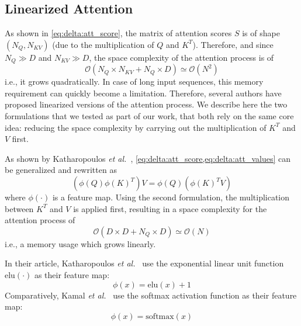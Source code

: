 \subsection{Linearized Attention}\label{sec:delta:intro_transf_att:lin_att}
As shown in \cref{eq:delta:att_score}, the matrix of attention scores \(S\) is of shape \((N_Q, N_{KV})\) (due to the multiplication of \(Q\) and \(K^T\)). Therefore, and since \(N_Q \gg D\) and \(N_{KV} \gg D\), the space complexity of the attention process is of
\begin{equation}
  \mathcal{O}(N_Q\times{}N_{KV}+N_Q\times{}D) \simeq \mathcal{O}(N^2) \label{eq:delta:full_att_complexity}
\end{equation}
i.e., it grows quadratically. In case of long input sequences, this memory requirement can quickly become a limitation. Therefore, several authors have proposed linearized versions of the attention process. We describe here the two formulations that we tested as part of our work, that both rely on the same core idea: reducing the space complexity by carrying out the multiplication of \(K^T\) and \(V\) first.

As shown by Katharopoulos \textit{et al.}~\cite{Katharopoulos2020TransformersAR}, \cref{eq:delta:att_score,eq:delta:att_values} can be generalized and rewritten as
\begin{equation}
  \left(\phi(Q) \phi(K)^T\right) V = \phi(Q) \left(\phi(K)^T V\right)
\end{equation}
where \(\phi(\cdot)\) is a feature map. Using the second formulation, the multiplication between \(K^T\) and \(V\) is applied first, resulting in a space complexity for the attention process of
\begin{equation}
  \mathcal{O}(D\times{}D+N_Q\times{}D) \simeq \mathcal{O}(N) \label{eq:delta:lin_att_complexity}
\end{equation}
i.e., a memory usage which grows linearly.

In their article, Katharopoulos \textit{et al.}~\cite{Katharopoulos2020TransformersAR} use the exponential linear unit function~\cite{Clevert2016FastAA} \(\text{elu}(\cdot)\) as their feature map:
\begin{equation}
  \phi(x) = \text{elu}(x) + 1
\end{equation}
Comparatively, Kamal \textit{et al.}~\cite{Kamal2023AssociativeMA} use the softmax activation function as their feature map:
\begin{equation}
  \phi(x) = \text{softmax}(x)
\end{equation}

